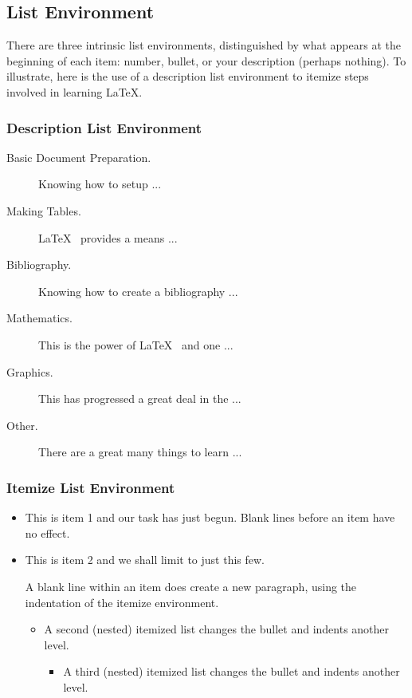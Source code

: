 \documentclass{article}
\begin{document}
\subsection{List Environment}
There are three intrinsic list environments, distinguished by what appears
at the beginning of each item: number, bullet, or your description (perhaps
nothing). To illustrate, here is the use of a description list environment
to itemize steps involved in learning \LaTeX.

\subsubsection{Description List Environment}
\begin{description}
	\item [Basic Document Preparation.] Knowing how to setup ...
	\item [Making Tables.] \LaTeX~ provides a means ...
	\item [Bibliography.] Knowing how to create a bibliography ...
	\item [Mathematics.] This is the power of \LaTeX~ and one ...
	\item [Graphics.] This has progressed a great deal in the ...
	\item [Other.] There are a great many things to learn ...
\end{description}

\subsubsection{Itemize List Environment}
\begin{itemize}
	\item This is item 1 and our task has just begun. Blank lines before an item have no effect.
	\item This is item 2 and we shall limit to just this few.

A blank line within an item does create a new paragraph,
using the indentation of the itemize environment.

	\begin{itemize}
		\item A second (nested) itemized list changes the bullet and indents another level.
			\begin{itemize}
					\item A third (nested) itemized list changes the bullet and indents another level.
			\end{itemize}
	\end{itemize}
\end{itemize}
\end{document}
